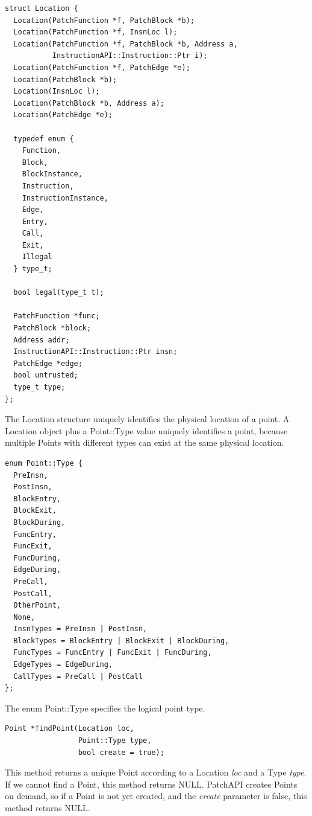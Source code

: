\documentclass[11pt]{article}
\begin{document}
\begin{verbatim}
struct Location {
  Location(PatchFunction *f, PatchBlock *b);
  Location(PatchFunction *f, InsnLoc l);
  Location(PatchFunction *f, PatchBlock *b, Address a,
           InstructionAPI::Instruction::Ptr i);
  Location(PatchFunction *f, PatchEdge *e);
  Location(PatchBlock *b);
  Location(InsnLoc l);
  Location(PatchBlock *b, Address a);
  Location(PatchEdge *e);

  typedef enum {
    Function,
    Block,
    BlockInstance,
    Instruction,
    InstructionInstance,
    Edge,
    Entry,
    Call,
    Exit,
    Illegal
  } type_t;

  bool legal(type_t t);

  PatchFunction *func;
  PatchBlock *block;
  Address addr;
  InstructionAPI::Instruction::Ptr insn;
  PatchEdge *edge;
  bool untrusted;
  type_t type;
};

\end{verbatim}



The Location structure uniquely identifies the physical location of a point.  A
Location object plus a Point::Type value uniquely identifies a point, because
multiple Points with different types can exist at the same physical location.


\begin{verbatim}
enum Point::Type {
  PreInsn,
  PostInsn,
  BlockEntry,
  BlockExit,
  BlockDuring,
  FuncEntry,
  FuncExit,
  FuncDuring,
  EdgeDuring,
  PreCall,
  PostCall,
  OtherPoint,
  None,
  InsnTypes = PreInsn | PostInsn,
  BlockTypes = BlockEntry | BlockExit | BlockDuring,
  FuncTypes = FuncEntry | FuncExit | FuncDuring,
  EdgeTypes = EdgeDuring,
  CallTypes = PreCall | PostCall
};

\end{verbatim}



The enum Point::Type specifies the logical point type.


\begin{verbatim}
Point *findPoint(Location loc,
                 Point::Type type,
                 bool create = true);

\end{verbatim}



This method returns a unique Point according to a Location \emph{loc} and a Type
\emph{type}. If we cannot find a Point, this method returns NULL. PatchAPI creates
Points on demand, so if a Point is not yet created, and the \emph{create} parameter
is false, this method returns NULL.
\end{document}
